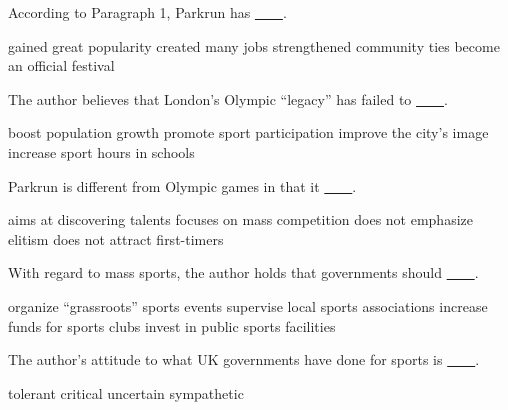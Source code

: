 \item According to Paragraph 1, Parkrun has \uline{~~~~}.
\begin{tasks}
	\task gained great popularity
	\task created many jobs
	\task strengthened community ties
	\task become an official festival
\end{tasks}
\item The author believes that London's Olympic ``legacy'' has failed to \uline{~~~~}.
\begin{tasks}
	\task boost population growth
	\task promote sport participation
	\task improve the city's image
	\task increase sport hours in schools
\end{tasks}
\item Parkrun is different from Olympic games in that it \uline{~~~~}.
\begin{tasks}
	\task aims at discovering talents
	\task focuses on mass competition
	\task does not emphasize elitism
	\task does not attract first-timers
\end{tasks}
\item With regard to mass sports, the author holds that governments should \uline{~~~~}.
\begin{tasks}
	\task organize ``grassroots'' sports events
	\task supervise local sports associations
	\task increase funds for sports clubs
	\task invest in public sports facilities
\end{tasks}
\item The author's attitude to what UK governments have done for sports is \uline{~~~~}.
\begin{tasks}
	\task tolerant
	\task critical
	\task uncertain
	\task sympathetic
\end{tasks}
